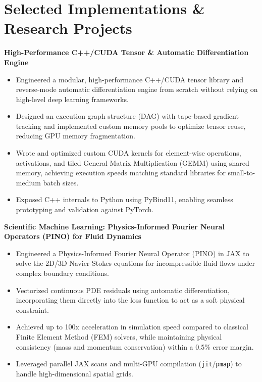 \documentclass[10pt, letterpaper]{article}
\begin{document}
\newpage

\section{Selected Implementations \& Research Projects}

\textbf{High-Performance C++/CUDA Tensor \& Automatic Differentiation Engine} 
\begin{itemize}
    \item Engineered a modular, high-performance C++/CUDA tensor library and reverse-mode automatic differentiation engine from scratch without relying on high-level deep learning frameworks.
    \item Designed an execution graph structure (DAG) with tape-based gradient tracking and implemented custom memory pools to optimize tensor reuse, reducing GPU memory fragmentation.
    \item Wrote and optimized custom CUDA kernels for element-wise operations, activations, and tiled General Matrix Multiplication (GEMM) using shared memory, achieving execution speeds matching standard libraries for small-to-medium batch sizes.
    \item Exposed C++ internals to Python using PyBind11, enabling seamless prototyping and validation against PyTorch.
\end{itemize}

\textbf{Scientific Machine Learning: Physics-Informed Fourier Neural Operators (PINO) for Fluid Dynamics}
\begin{itemize}
    \item Engineered a Physics-Informed Fourier Neural Operator (PINO) in JAX to solve the 2D/3D Navier-Stokes equations for incompressible fluid flows under complex boundary conditions.
    \item Vectorized continuous PDE residuals using automatic differentiation, incorporating them directly into the loss function to act as a soft physical constraint.
    \item Achieved up to 100x acceleration in simulation speed compared to classical Finite Element Method (FEM) solvers, while maintaining physical consistency (mass and momentum conservation) within a 0.5\% error margin.
    \item Leveraged parallel JAX scans and multi-GPU compilation (\texttt{jit}/\texttt{pmap}) to handle high-dimensional spatial grids.
\end{itemize}
\end{document}
